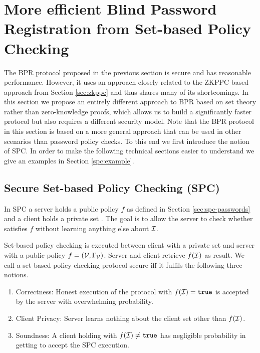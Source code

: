 \section[SPC-based Password Registration]{More efficient Blind Password Registration from Set-based Policy Checking}\label{sec:spc-bpr}

The \ac{BPR} protocol proposed in the previous section is secure and has reasonable performance.
However, it uses an approach closely related to the \ac{ZKPPC}-based approach from Section \ref{sec:zkppc} and thus shares many of its shortcomings.
In this section we propose an entirely different approach to \acl{BPR} based on set theory rather than zero-knowledge proofs, which allows us to build a significantly faster protocol but also requires a different security model.
Note that the \ac{BPR} protocol in this section is based on a more general approach that can be used in other scenarios than password policy checks.
To this end we first introduce the notion of \acl{SPC}.
In order to make the following technical sections easier to understand we give an examples in Section \ref{spc:example}.

\subsection{Secure Set-based Policy Checking (SPC)} \label{sec:spc}
In \ac{SPC} a server holds a public policy $f$ as defined in Section \ref{sec:spc-passwords} and a client holds a private set \ClientSet. 
The goal is to allow the server to check whether \ClientSet satisfies $f$ without learning anything else about $\mathcal{I}$. 

\begin{definition}\label{def:SPC}
Set-based policy checking is executed between client \Client with a private set \ClientSet and server \Server with a public policy $f=(\mathcal{V},\Gamma_\mathcal{V})$.
Server and client retrieve $f(\mathcal{I})$ as result. 
We call a set-based policy checking protocol secure iff it fulfils the following three notions.
\begin{enumerate}
  \item Correctness: Honest execution of the protocol with $f(\mathcal{I})=\mathtt{true}$ is accepted by the server with overwhelming probability.
  \item Client Privacy: Server \Server learns nothing about the client set \ClientSet other than $f(\mathcal{I})$.
  \item Soundness: A client \Client holding \ClientSet with $f(\mathcal{I})\not=\mathtt{true}$ has negligible probability in getting \Server to accept the \ac{SPC} execution. \eod
\end{enumerate}
\end{definition}

